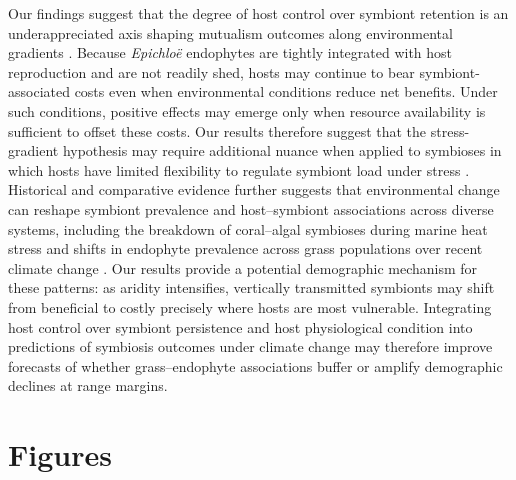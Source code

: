 \documentclass[12pt]{article}\usepackage[]{graphicx}\usepackage[dvipsnames]{xcolor}
\begin{document}
Our findings suggest that the degree of host control over symbiont retention is an underappreciated axis shaping mutualism outcomes along environmental gradients \citep{bronstein2001exploitation}. 
Because \textit{Epichloë} endophytes are tightly integrated with host reproduction and are not readily shed, hosts may continue to bear symbiont-associated costs even when environmental conditions reduce net benefits. 
Under such conditions, positive effects may emerge only when resource availability is sufficient to offset these costs. 
Our results therefore suggest that the stress-gradient hypothesis may require additional nuance when applied to symbioses in which hosts have limited flexibility to regulate symbiont load under stress \citep{david2018microbial}. 
Historical and comparative evidence further suggests that environmental change can reshape symbiont prevalence and host–symbiont associations across diverse systems, including the breakdown of coral--algal symbioses during marine heat stress \citep{hoeksema2000pursuing} and shifts in endophyte prevalence across grass populations over recent climate change \citep{fowler2025increasing, li2026climate}. 
Our results provide a potential demographic mechanism for these patterns: as aridity intensifies, vertically transmitted symbionts may shift from beneficial to costly precisely where hosts are most vulnerable. 
Integrating host control over symbiont persistence and host physiological condition into predictions of symbiosis outcomes under climate change may therefore improve forecasts of whether grass--endophyte associations buffer or amplify demographic declines at range margins.

\newpage
%



\clearpage
\section*{Figures}
\end{document}
